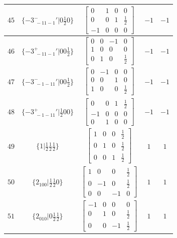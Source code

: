 \documentclass[fleqn,8pt]{jsarticle}
\begin{document}
\begin{longtable}{ccccc}
$ 45 $ & $ \{-3^{-}_{\,\,-11-1}{}'|0 \frac{1}{2} 0\} $ & $ \begin{bmatrix} 0 & 1 & 0 & 0 \\ 0 & 0 & 1 & \frac{1}{2} \\ -1 & 0 & 0 & 0 \end{bmatrix} $ & $ -1 $ & $ -1 $ \\ \hline
$ 46 $ & $ \{-3^{+}_{\,\,-11-1}{}'|0 0 \frac{1}{2}\} $ & $ \begin{bmatrix} 0 & 0 & -1 & 0 \\ 1 & 0 & 0 & 0 \\ 0 & 1 & 0 & \frac{1}{2} \end{bmatrix} $ & $ -1 $ & $ -1 $ \\ \hline
$ 47 $ & $ \{-3^{-}_{\,\,-1-11}{}'|0 0 \frac{1}{2}\} $ & $ \begin{bmatrix} 0 & -1 & 0 & 0 \\ 0 & 0 & 1 & 0 \\ 1 & 0 & 0 & \frac{1}{2} \end{bmatrix} $ & $ -1 $ & $ -1 $ \\ \hline
$ 48 $ & $ \{-3^{+}_{\,\,-1-11}{}'|\frac{1}{2} 0 0\} $ & $ \begin{bmatrix} 0 & 0 & 1 & \frac{1}{2} \\ -1 & 0 & 0 & 0 \\ 0 & 1 & 0 & 0 \end{bmatrix} $ & $ -1 $ & $ -1 $ \\ \hline
$ 49 $ & $ \{1|\frac{1}{2} \frac{1}{2} \frac{1}{2}\} $ & $ \begin{bmatrix} 1 & 0 & 0 & \frac{1}{2} \\ 0 & 1 & 0 & \frac{1}{2} \\ 0 & 0 & 1 & \frac{1}{2} \end{bmatrix} $ & $ 1 $ & $ 1 $ \\ \hline
$ 50 $ & $ \{2{}_{100}|\frac{1}{2} \frac{1}{2} 0\} $ & $ \begin{bmatrix} 1 & 0 & 0 & \frac{1}{2} \\ 0 & -1 & 0 & \frac{1}{2} \\ 0 & 0 & -1 & 0 \end{bmatrix} $ & $ 1 $ & $ 1 $ \\ \hline
$ 51 $ & $ \{2{}_{010}|0 \frac{1}{2} \frac{1}{2}\} $ & $ \begin{bmatrix} -1 & 0 & 0 & 0 \\ 0 & 1 & 0 & \frac{1}{2} \\ 0 & 0 & -1 & \frac{1}{2} \end{bmatrix} $ & $ 1 $ & $ 1 $ \\ \hline

\end{longtable}
\end{document}
